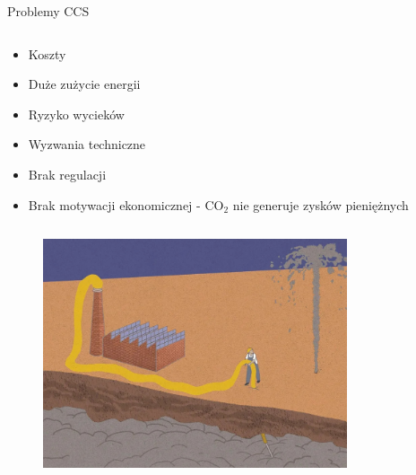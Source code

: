 \begin{columnframe}{Problemy CCS}
    \begin{column}{0.5\textwidth}
        \begin{itemize}
            \item Koszty
            \item Duże zużycie energii
            \item Ryzyko wycieków
            \item Wyzwania techniczne
            \item Brak regulacji
            \item Brak motywacji ekonomicznej - CO$_2$ nie generuje zysków pieniężnych
        \end{itemize}
    \end{column}
    \begin{column}{0.5\textwidth}
        \begin{figure}
            \centering
            \includegraphics[width=0.8\textwidth, frame]{images/anti_ccs_propaganda.jpg}
        \end{figure}
    \end{column}
\end{columnframe}